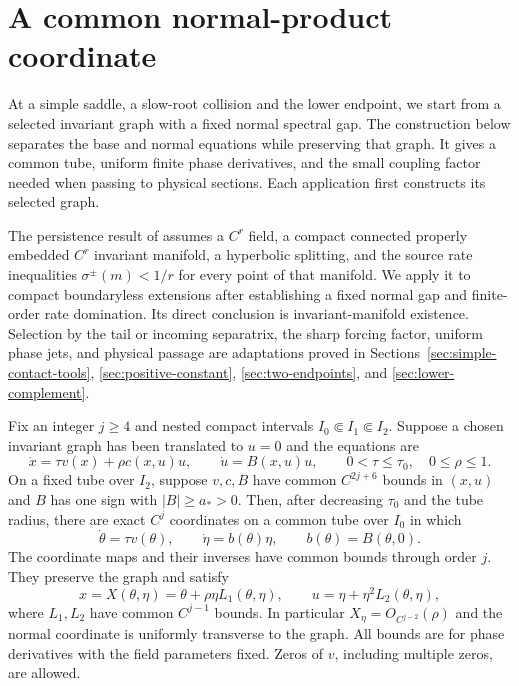 \section{A common normal-product coordinate}\label{sec:normal-product}

At a simple saddle, a slow-root collision and the lower endpoint, we
start from a selected invariant graph with a fixed normal spectral gap.
The construction below separates the base and normal equations while
preserving that graph. It gives a common tube, uniform finite phase
derivatives, and the small coupling factor needed when passing to
physical sections. Each application first constructs its selected graph.

The persistence result of
\cite[Theorem~3, p.~215]{Fenichel1971} assumes a $C^r$ field,
a compact connected properly embedded $C^r$ invariant manifold,
a hyperbolic splitting, and the source rate inequalities
$\sigma^\pm(m)<1/r$ for every point of that manifold.
We apply it to compact boundaryless extensions after establishing a
fixed normal gap and finite-order rate domination. Its direct conclusion
is invariant-manifold existence. Selection by the tail or incoming
separatrix, the sharp forcing factor, uniform phase jets, and physical
passage are adaptations proved in Sections~\ref{sec:simple-contact-tools},
\ref{sec:positive-constant}, \ref{sec:two-endpoints}, and
\ref{sec:lower-complement}.

\begin{lemma}\label{lem:uniform-normal-product}
Fix an integer $j\ge4$ and nested compact intervals
$I_0\Subset I_1\Subset I_2$. Suppose a chosen invariant graph has been
translated to $u=0$ and the equations are
\begin{equation}\label{eq:uniform-normal-input}
 \dot x=\tau v(x)+\rho c(x,u)u,\qquad
 \dot u=B(x,u)u,\qquad 0<\tau\le\tau_0,
 \quad 0\le\rho\le1.
\end{equation}
On a fixed tube over $I_2$, suppose $v,c,B$ have common
$C^{2j+6}$ bounds in $(x,u)$ and $B$ has one sign with $|B|\ge a_*>0$.
Then, after decreasing $\tau_0$ and the tube radius, there are exact
$C^j$ coordinates on a common tube over $I_0$ in which
\begin{equation}\label{eq:uniform-normal-product}
 \dot\theta=\tau v(\theta),\qquad
 \dot\eta=b(\theta)\eta,
 \qquad b(\theta)=B(\theta,0).
\end{equation}
The coordinate maps and their inverses have common bounds through order
$j$. They preserve the graph and satisfy
\[
 x=X(\theta,\eta)=\theta+\rho\eta L_1(\theta,\eta),
 \qquad u=\eta+\eta^2L_2(\theta,\eta),
\]
where $L_1,L_2$ have common $C^{j-1}$ bounds.
In particular $X_\eta=O_{C^{j-2}}(\rho)$ and the normal coordinate is
uniformly transverse to the graph. All bounds are for phase derivatives
with the field parameters fixed. Zeros of $v$, including multiple zeros,
are allowed.
\end{lemma}

